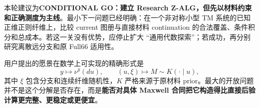 本轮建议为\textbf{CONDITIONAL GO：建立 Research Z-ALG，但先以材料约束和正确测度为主线}。最小下一问题已经明确：在一个非对称小型 TM 系统的已知正维正则纤维上，比较 current 图册与直接材料 continuation 的合法覆盖、条件积分和总成本。若这一关没有优势，应停止扩大 ``通用代数探索''；若成功，再分别研究离散远分支和原 Full66 适用性。

用户提出的愿景在数学上可实现的精确形式是
\begin{equation}
y\longmapsto\nu^y(du),\qquad
(u,\xi)\longmapsto M\sim K(\cdot\mid u),
\end{equation}
其中 $\xi$ 包含分支和连续纤维随机性，$K$ 严格来源于原材料 prior。最大的开放问题并不是这个分解是否存在，而是\textbf{能否对具体 Maxwell 合同把它构造得比直接后验计算更完整、更稳定或更便宜}。
